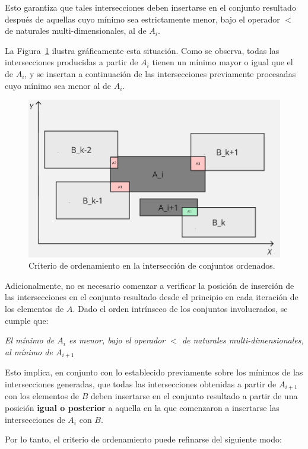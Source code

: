 Esto garantiza que tales intersecciones deben insertarse en el conjunto resultado después de aquellas cuyo mínimo sea estrictamente menor, bajo el operador $<$ de naturales multi-dimensionales, al de $A_i$. 

La Figura~\ref{fig:enter-label} ilustra gráficamente esta situación. Como se observa, todas las intersecciones producidas a partir de $A_i$ tienen un mínimo mayor o igual que el de $A_i$, y se insertan a continuación de las intersecciones previamente procesadas cuyo mínimo sea menor al de $A_i$.

\begin{figure}[h]
    \centering
    \includegraphics[width=0.7\linewidth]{figures/Optimazaciones/Interseccion/crit ordenamiento.png}
    \caption{Criterio de ordenamiento en la intersección de conjuntos ordenados.}
    \label{fig:enter-label}
\end{figure}

Adicionalmente, no es necesario comenzar a verificar la posición de inserción de las intersecciones en el conjunto resultado desde el principio en cada iteración de los elementos de $A$. Dado el orden intrínseco de los conjuntos involucrados, se cumple que:
\begin{center}
    \textit{El mínimo de $A_i$ es menor, bajo el operador $<$ de naturales multi-dimensionales, al mínimo de $A_{i+1}$}
\end{center}

Esto implica, en conjunto con lo establecido previamente sobre los mínimos de las intersecciones generadas, que todas las intersecciones obtenidas a partir de $A_{i+1}$ con los elementos de $B$ deben insertarse en el conjunto resultado a partir de una posición \textbf{igual o posterior} a aquella en la que comenzaron a insertarse las intersecciones de $A_i$ con $B$.

Por lo tanto, el criterio de ordenamiento puede refinarse del siguiente modo:




